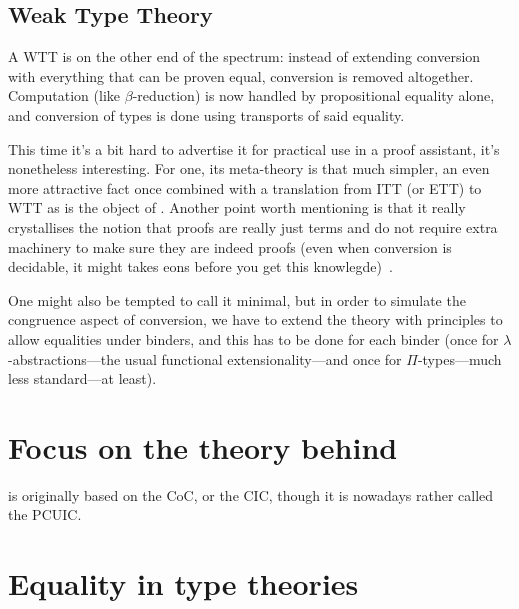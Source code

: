 \subsection{Weak Type Theory}

A \acrfull{WTT} is on the other end of the spectrum: instead of extending
conversion with everything that can be proven equal, conversion is removed
altogether. Computation (like \(\beta\)-reduction) is now handled by
propositional equality alone, and conversion of types is done using transports
of said equality.

This time it's a bit hard to advertise it for practical use in a proof
assistant, it's nonetheless interesting. For one, its meta-theory is that much
simpler, an even more attractive fact once combined with a translation from
\acrshort{ITT} (or \acrshort{ETT}) to \acrshort{WTT} as is the object of
.
Another point worth mentioning is that it really crystallises the notion that
proofs are really just terms and do not require extra machinery to make sure
they are indeed proofs (even when conversion is decidable, it might takes
eons before you get this knowlegde)~\misref.

One might also be tempted to call it minimal, but in order to simulate the
congruence aspect of conversion, we have to extend the theory with principles
to allow equalities under binders, and this has to be done for each binder
(once for \(\lambda\)-abstractions---the usual functional extensionality---and
once for \(\Pi\)-types---much less standard---at least).

\section{Focus on the theory behind \Coq}

\Coq is originally based on the \acrfull{CoC}, or the \acrfull{CIC}, though it
is nowadays rather called the \acrfull{PCUIC}.

\section{Equality in type theories}


